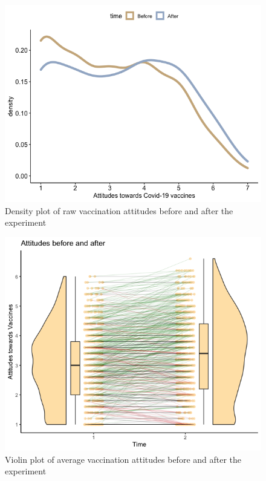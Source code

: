 \documentclass[english,,jou,floatsintext]{apa6}
\begin{document}
\begin{figure}

{\centering \includegraphics[width=1\linewidth]{../plots/raw_density} 

}

\caption{Density plot of raw vaccination attitudes before and after the experiment}\label{fig:rawdensity}
\end{figure}

\begin{figure}

{\centering \includegraphics[width=1\linewidth]{../plots/before_and_after_violin} 

}

\caption{Violin plot of average vaccination attitudes before and after the experiment}\label{fig:beforeafter}
\end{figure}
\end{document}
